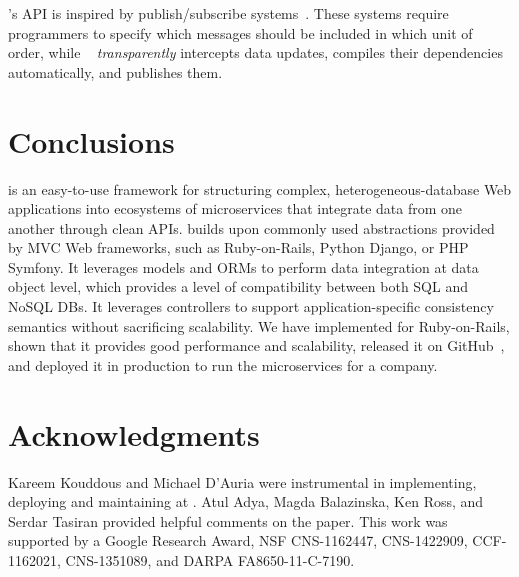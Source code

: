 \synapse's API is inspired by publish/subscribe systems~\cite{siena,scribe,thialfi,gryphon,hermes}.
These systems require programmers to specify which
messages should be included in which unit of order, while \synapse \ {\em
transparently} intercepts data updates, compiles their dependencies
automatically, and publishes them.

\section{Conclusions} \label{sec:conclusion}

\synapse is an easy-to-use framework for structuring complex,
heterogeneous-database Web applications into ecosystems of microservices that
integrate data from one another through clean APIs.  \synapse builds upon
commonly used abstractions provided by MVC Web frameworks, such as
Ruby-on-Rails, Python Django, or PHP Symfony. It leverages models and ORMs to
perform data integration at data object level, which provides a level of
compatibility between both SQL and NoSQL DBs. It leverages controllers to
support application-specific consistency semantics without sacrificing
scalability.  We have implemented \synapse for Ruby-on-Rails,
shown that it provides good performance and scalability, released it
on GitHub~\cite{synapse-sources}, and deployed it in production to
run the microservices for a company.

\section{Acknowledgments}
Kareem Kouddous and Michael D'Auria were instrumental in implementing,
deploying and maintaining \synapse at \crowdtap.
Atul Adya, Magda Balazinska, Ken Ross, and Serdar Tasiran provided
helpful comments on the paper.
This work was supported by a Google Research Award,
NSF CNS-1162447, CNS-1422909, CCF-1162021, CNS-1351089,
and DARPA FA8650-11-C-7190.
